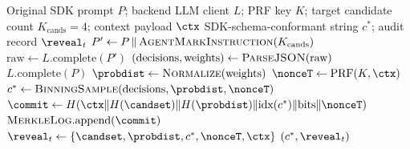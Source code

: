 \begin{algorithm}[t]
\caption{Watermarked LLM call (per-decision)}
\label{alg:sample}
\begin{algorithmic}[1]
\Require Original SDK prompt $P$; backend LLM client $L$; PRF key $K$;
target candidate count $K_{\text{cands}}{=}4$; context payload $\ctx$
\Ensure SDK-schema-conformant string $c^*$; audit record $\reveal_t$
\Statex
\State $P' \gets P \,\|\, \textsc{AgentMarkInstruction}(K_{\text{cands}})$
\State $\text{raw} \gets L.\text{complete}(P')$ 
\State $(\text{decisions}, \text{weights}) \gets \textsc{ParseJSON}(\text{raw})$
  \State \Return $L.\text{complete}(P)$ 
\EndIf
\State $\probdist \gets \textsc{Normalize}(\text{weights})$
\State $\nonceT \gets \text{PRF}(K, \ctx)$
\State $c^* \gets \textsc{BinningSample}(\text{decisions}, \probdist, \nonceT)$
\State $\commit \gets H(\ctx \| H(\candset) \| H(\probdist) \| \text{idx}(c^*) \| \text{bits} \| \nonceT)$
\State $\textsc{MerkleLog}.\text{append}(\commit)$
\State $\reveal_t \gets \{\candset, \probdist, c^*, \nonceT, \ctx\}$
\State \Return $(c^*, \reveal_t)$
\end{algorithmic}
\end{algorithm}
